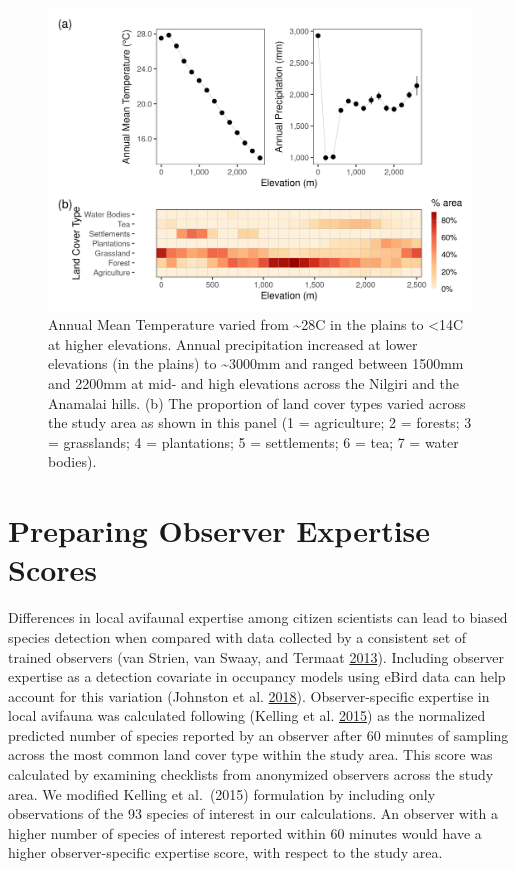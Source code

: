 \documentclass[]{article}
\begin{document}
\begin{figure}
\centering
\includegraphics{figs/fig_02_clim_lc_elev.png}
\caption{Annual Mean Temperature varied from \textasciitilde{}28C in the plains to \textless{}14C at higher elevations. Annual precipitation increased at lower elevations (in the plains) to \textasciitilde{}3000mm and ranged between 1500mm and 2200mm at mid- and high elevations across the Nilgiri and the Anamalai hills. (b) The proportion of land cover types varied across the study area as shown in this panel (1 = agriculture; 2 = forests; 3 = grasslands; 4 = plantations; 5 = settlements; 6 = tea; 7 = water bodies).}
\end{figure}

\hypertarget{preparing-observer-expertise-scores}{%
\section{Preparing Observer Expertise Scores}\label{preparing-observer-expertise-scores}}

Differences in local avifaunal expertise among citizen scientists can lead to biased species detection when compared with data collected by a consistent set of trained observers (van Strien, van Swaay, and Termaat \protect\hyperlink{ref-vanstrien2013}{2013}). Including observer expertise as a detection covariate in occupancy models using eBird data can help account for this variation (Johnston et al. \protect\hyperlink{ref-johnston2018}{2018}). Observer-specific expertise in local avifauna was calculated following (Kelling et al. \protect\hyperlink{ref-kelling2015a}{2015}) as the normalized predicted number of species reported by an observer after 60 minutes of sampling across the most common land cover type within the study area. This score was calculated by examining checklists from anonymized observers across the study area. We modified Kelling et al.~(2015) formulation by including only observations of the 93 species of interest in our calculations. An observer with a higher number of species of interest reported within 60 minutes would have a higher observer-specific expertise score, with respect to the study area.
\end{document}
